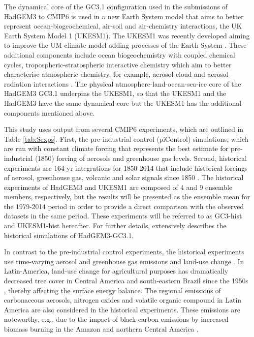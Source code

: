The dynamical core of the GC3.1 configuration used in the submissions of HadGEM3 to CMIP6 is used in a new Earth System model that aims to better represent ocean-biogeochemical, air-soil and air-chemistry interactions, the UK Earth System Model 1 (UKESM1). 
The UKESM1 was recently developed aiming to improve the UM climate model adding processes of the Earth System \citep{sellar2019}. These additional components include ocean biogeochemistry with coupled chemical cycles, tropospheric-stratospheric interactive chemistry which aim to better characterise atmospheric chemistry, for example, aerosol-cloud and aerosol-radiation interactions \citep{mulcahy2018,sellar2019}.
The physical atmosphere-land-ocean-sea-ice core of the HadGEM3 GC3.1 underpins the UKESM1, so that the UKESM1 and the HadGEM3 have the same dynamical core but the UKESM1 has the additional components mentioned above.



This study uses output from several CMIP6 experiments, which are outlined in Table \ref{tab:Sexps}. First, the pre-industrial control (piControl) simulations, which are run with constant climate forcing that represents the best estimate for pre-industrial (1850) forcing of aerosols and greenhouse gas levels. Second, historical experiments are 164-yr integrations for 1850-2014 that include historical forcings of aerosol, greenhouse gas, volcanic and solar signals since 1850 \citep{eyring2016,andrews2019}. 
The historical experiments of HadGEM3 and UKESM1 are composed of 4 and 9 ensemble members, respectively, but the results will be presented as the ensemble mean for the 1979-2014 period in order to provide a direct comparison with the observed datasets in the same period.
These experiments will be referred to as GC3-hist and UKESM1-hist hereafter.
For further details, \cite{andrews2020} extensively describes the historical simulations of HadGEM3-GC3.1. %

In contrast to the pre-industrial control experiments, the historical experiments use  time-varying aerosol and greenhouse gas emissions and land-use change \citep{eyring2016}. In Latin-America, land-use change for agricultural purposes has dramatically decreased tree cover in Central America and south-eastern Brazil since the 1950s \citep{lawrence2012}, thereby affecting the surface energy balance. %
The regional emissions of carbonaceous aerosols, nitrogen oxides and volatile organic compound in Latin America are also considered in the historical experiments. These emissions are noteworthy, e.g., due to the impact of black carbon emissions by increased biomass burning in the Amazon and northern Central America \citep{chuvieco2008}.  


